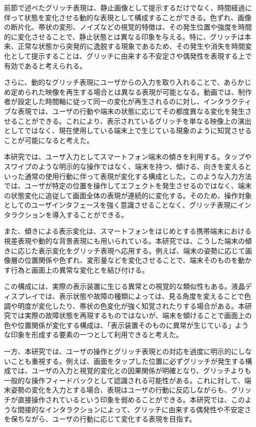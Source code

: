 前節で述べたグリッチ表現は、静止画像として提示するだけでなく、時間経過に伴って状態を変化させる動的な表現として構成することができる。色ずれ、画像の断片化、帯状の変形、ノイズなどの視覚的特徴は、その発生位置や強度を時間的に変化させることで、静止状態とは異なる印象を与える。特に、グリッチは本来、正常な状態から突発的に逸脱する現象であるため、その発生や消失を時間変化として提示することは、グリッチに由来する不安定さや偶発性を表現する上で有効であると考えられる。

さらに、動的なグリッチ表現にユーザからの入力を取り入れることで、あらかじめ定められた映像を再生する場合とは異なる表現が可能となる。動画では、制作者が設定した時間軸に従って同一の変化が再生されるのに対し、インタラクティブな表現では、ユーザの行動や端末の状態に応じてその都度異なる変化を発生させることができる。これにより、表示されているグリッチを単なる映像上の演出としてではなく、現在使用している端末上で生じている現象のように知覚させることが可能になると考えた。

本研究では、ユーザ入力としてスマートフォン端末の傾きを利用する。タップやスワイプのような明示的な操作ではなく、端末を持つ、傾ける、向きを変えるといった通常の使用行動に伴って表現が変化する構成とした。このような入力方法では、ユーザが特定の位置を操作してエフェクトを発生させるのではなく、端末の状態変化に追従して画面全体の表現が連続的に変化する。そのため、操作対象としてのユーザインタフェースを強く意識させることなく、グリッチ表現にインタラクションを導入することができる。

また、傾きによる表示変化は、スマートフォンをはじめとする携帯端末における視差表現や動的な背景表現にも用いられている。本研究では、こうした端末の傾きに応じた表示変化をグリッチ表現へ応用する。例えば、端末の姿勢に応じて画像層の位置関係や色ずれ、変形量などを変化させることで、端末そのものを動かす行為と画面上の異常な変化とを結び付ける。

この構成には、実際の表示装置に生じる異常との視覚的な類似性もある。液晶ディスプレイでは、表示状態や故障の種類によっては、見る角度を変えることで色調や明度が変化したり、帯状の色変化が強く知覚されたりする場合がある。本研究では実際の故障状態を再現するものではないが、端末を傾けることで画面上の色や位置関係が変化する構成は、「表示装置そのものに異常が生じている」ような印象を形成する要素の一つとして利用できると考えた。

一方、本研究では、ユーザの操作とグリッチ表現との対応を過度に明示的にしないことも重視する。例えば、画面をタップした位置に必ずグリッチが発生する構成では、ユーザの入力と視覚的変化との因果関係が明確となり、グリッチよりも一般的な操作フィードバックとして認識される可能性がある。これに対して、端末姿勢の変化を入力とする場合、表現はユーザの行動に反応しながらも、グリッチが直接操作されているという印象を弱めることができる。本研究では、このような間接的なインタラクションによって、グリッチに由来する偶発性や不安定さを保ちながら、ユーザの行動に応じて変化する表現を目指す。

